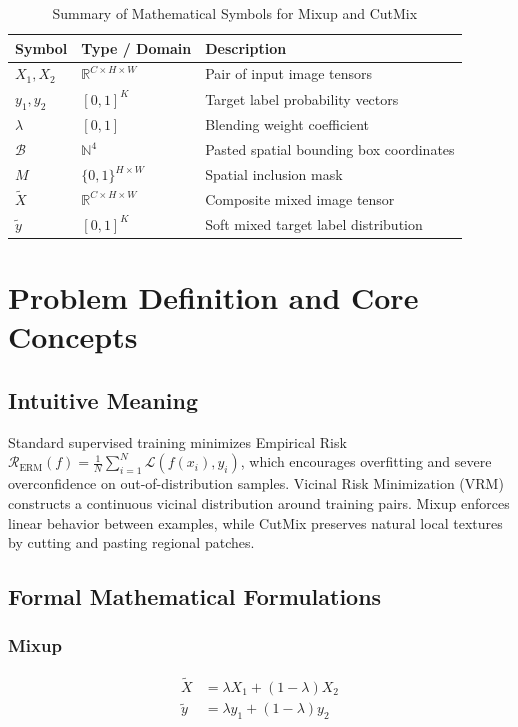 \documentclass[11pt,a4paper]{article}
\theoremstyle{definition}
\begin{document}
\begin{table}[h]
\centering
\caption{Summary of Mathematical Symbols for Mixup and CutMix}
\begin{tabular}{lll}
\toprule
\textbf{Symbol} & \textbf{Type / Domain} & \textbf{Description} \\
\midrule
$X_1, X_2$ & $\mathbb{R}^{C \times H \times W}$ & Pair of input image tensors \\
$y_1, y_2$ & $[0, 1]^K$ & Target label probability vectors \\
$\lambda$ & $[0, 1]$ & Blending weight coefficient \\
$\mathcal{B}$ & $\mathbb{N}^4$ & Pasted spatial bounding box coordinates \\
$M$ & $\{0, 1\}^{H \times W}$ & Spatial inclusion mask \\
$\tilde{X}$ & $\mathbb{R}^{C \times H \times W}$ & Composite mixed image tensor \\
$\tilde{y}$ & $[0, 1]^K$ & Soft mixed target label distribution \\
\bottomrule
\end{tabular}
\end{table}

\section{Problem Definition and Core Concepts}

\subsection{Intuitive Meaning}
Standard supervised training minimizes Empirical Risk $\mathcal{R}_{\text{ERM}}(f) = \frac{1}{N} \sum_{i=1}^N \mathcal{L}(f(x_i), y_i)$, which encourages overfitting and severe overconfidence on out-of-distribution samples. Vicinal Risk Minimization (VRM) constructs a continuous vicinal distribution around training pairs. Mixup enforces linear behavior between examples, while CutMix preserves natural local textures by cutting and pasting regional patches.

\subsection{Formal Mathematical Formulations}

\subsubsection{Mixup}
\begin{align}
\tilde{X} &= \lambda X_1 + (1 - \lambda) X_2 \\
\tilde{y} &= \lambda y_1 + (1 - \lambda) y_2
\end{align}
\end{document}
